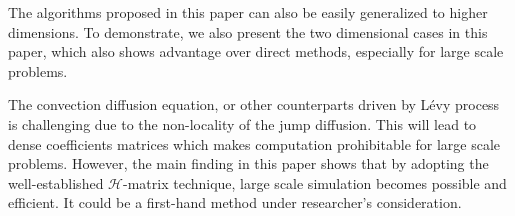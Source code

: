 \documentclass[3p,,preprint,12pt]{elsarticle}
\theoremstyle{definition}
\begin{document}
The algorithms proposed in this paper can also be easily generalized to higher dimensions. To demonstrate, we also present the two dimensional cases in this paper, which also shows advantage over direct methods, especially for large scale problems. 

The convection diffusion equation, or other counterparts driven by L\'evy process is challenging due to the non-locality of the jump diffusion. This will lead to dense coefficients matrices which makes computation prohibitable for large scale problems. However, the main finding in this paper shows that by adopting the well-established $\mathcal{H}$-matrix technique, large scale simulation becomes possible and efficient. It could be a first-hand method under researcher's consideration.    

\section*{\refname}


\end{document}
